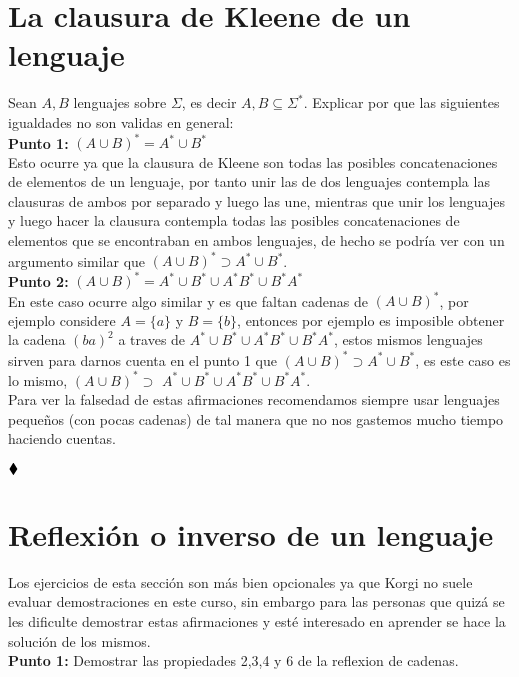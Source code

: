 \section{La clausura de Kleene de un lenguaje}
Sean $A,B$ lenguajes sobre $\Sigma$, es decir $A,B\subseteq\Sigma^*.$ Explicar por que las siguientes igualdades no son validas en general:\\
\textbf{Punto 1: } $(A\cup B)^*=A^*\cup B^*$\\ 
Esto ocurre ya que la clausura de Kleene son todas las posibles concatenaciones de elementos de un lenguaje, por tanto unir las de dos lenguajes contempla las clausuras de ambos por separado y luego las une, mientras que unir los lenguajes y luego hacer la clausura contempla todas las posibles concatenaciones de elementos que se encontraban en ambos lenguajes, de hecho se podría ver con un argumento similar que $(A\cup B)^*\supset A^* \cup B^*$.\\


\textbf{Punto 2: } $(A\cup B)^*=A^*\cup B^*\cup A^*B^*\cup B^*A^*$ \\
 En este caso ocurre algo similar y es que faltan cadenas de $(A \cup B)^*$, por ejemplo considere $A=\{a\}$ y $B=\{b\}$, entonces por ejemplo es imposible obtener la cadena $(ba)^2$ a traves de $A^* \cup B^* \cup A^* B^* \cup B^* A^*$, estos mismos lenguajes sirven para darnos cuenta en el punto 1 que $(A \cup B)^*\supset A^*\cup B^*$, es este caso es lo mismo, $(A \cup B)^* \supset$ $A^* \cup B^* \cup A^* B^* \cup B^* A^*$.\\

Para ver la falsedad de estas afirmaciones recomendamos siempre usar lenguajes pequeños (con pocas cadenas) de tal manera que no nos gastemos mucho tiempo haciendo cuentas. 


$\hfill \blacklozenge$

\section{Reflexión o inverso de un lenguaje}

Los ejercicios de esta sección son más bien opcionales ya que Korgi no suele evaluar demostraciones en este curso, sin embargo para las personas que quizá se les dificulte demostrar estas afirmaciones y esté interesado en aprender se hace la solución de los mismos.\\

\textbf{Punto 1: }Demostrar las propiedades 2,3,4 y 6 de la reflexion de cadenas. 

